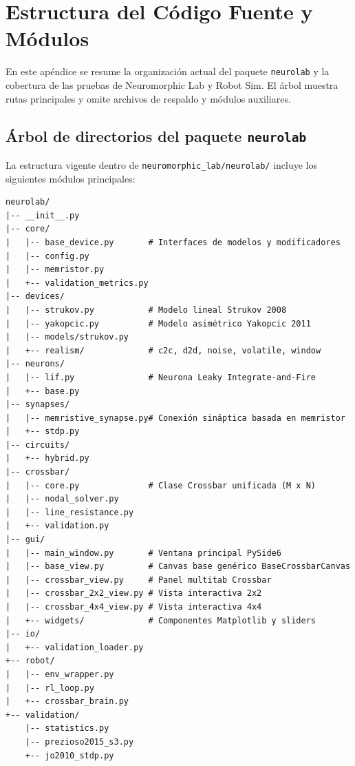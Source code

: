 \chapter{Estructura del Código Fuente y Módulos}
\label{ch:apendice_codigo}
\renewcommand{\thesubsection}{\thesection.\arabic{subsection}}

En este apéndice se resume la organización actual del paquete \texttt{neurolab} y la cobertura de las pruebas de Neuromorphic Lab y Robot Sim. El árbol muestra rutas principales y omite archivos de respaldo y módulos auxiliares.

\section{Árbol de directorios del paquete \texttt{neurolab}}
\label{sec:arbol_codigo}

La estructura vigente dentro de \texttt{neuromorphic\_lab/neurolab/} incluye los siguientes módulos principales:

\begin{verbatim}
neurolab/
|-- __init__.py
|-- core/
|   |-- base_device.py       # Interfaces de modelos y modificadores
|   |-- config.py
|   |-- memristor.py
|   +-- validation_metrics.py
|-- devices/
|   |-- strukov.py           # Modelo lineal Strukov 2008
|   |-- yakopcic.py          # Modelo asimétrico Yakopcic 2011
|   |-- models/strukov.py
|   +-- realism/             # c2c, d2d, noise, volatile, window
|-- neurons/
|   |-- lif.py               # Neurona Leaky Integrate-and-Fire
|   +-- base.py
|-- synapses/
|   |-- memristive_synapse.py# Conexión sináptica basada en memristor
|   +-- stdp.py
|-- circuits/
|   +-- hybrid.py
|-- crossbar/
|   |-- core.py              # Clase Crossbar unificada (M x N)
|   |-- nodal_solver.py
|   |-- line_resistance.py
|   +-- validation.py
|-- gui/
|   |-- main_window.py       # Ventana principal PySide6
|   |-- base_view.py         # Canvas base genérico BaseCrossbarCanvas
|   |-- crossbar_view.py     # Panel multitab Crossbar
|   |-- crossbar_2x2_view.py # Vista interactiva 2x2
|   |-- crossbar_4x4_view.py # Vista interactiva 4x4
|   +-- widgets/             # Componentes Matplotlib y sliders
|-- io/
|   +-- validation_loader.py
+-- robot/
|   |-- env_wrapper.py
|   |-- rl_loop.py
|   +-- crossbar_brain.py
+-- validation/
    |-- statistics.py
    |-- prezioso2015_s3.py
    +-- jo2010_stdp.py
\end{verbatim}

